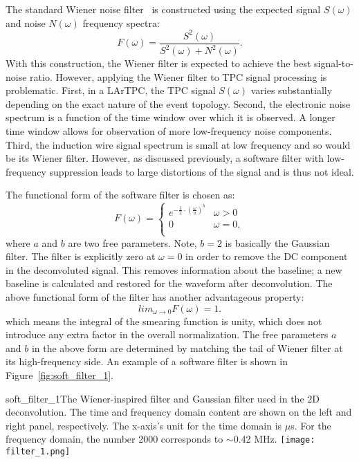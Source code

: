 The standard Wiener noise filter~\cite{wiener} is constructed using the expected 
signal $S(\omega)$ and noise $N(\omega)$ frequency spectra:
\begin{equation}
F(\omega) = \frac{S^2(\omega)}{S^2(\omega) + N^2(\omega)}.
\end{equation}
With this construction, the Wiener filter is expected to achieve the best signal-to-noise ratio. 
However, applying the Wiener filter to TPC signal processing is problematic. 
First, in a LArTPC, the TPC signal $S(\omega)$ varies substantially
depending on the exact nature of the event topology.
Second, the electronic noise spectrum is a function of the time window
over which it is observed. A longer time window allows for observation
of more low-frequency noise components.
Third, the induction wire signal spectrum is small at low frequency
and so would be its  Wiener filter.  However, as discussed previously, 
a software filter with low-frequency suppression leads to large distortions 
of the signal and is thus not ideal.  

The functional form of the software filter is chosen as:
\begin{equation}
F(\omega) = 
\begin{cases}
e^{- \frac{1}{2} \cdot \left( \frac{\omega}{a} \right)^b} &  \omega >0 \\
0 &  \omega = 0, \\
\end{cases}
\end{equation}
where $a$ and $b$ are two free parameters.  Note, $b=2$ is basically the Gaussian filter. 
The filter is explicitly zero at $\omega = 0$ in order to remove the DC component in the 
deconvoluted signal. This removes information about the baseline;  a new baseline is 
calculated and restored for the waveform after deconvolution. The above functional form 
of the filter has another advantageous property:
\begin{equation}
lim_{\omega \rightarrow 0} F(\omega) = 1.
\end{equation}
which means the integral of the smearing function is unity, which does not introduce any
extra factor in the overall normalization. The free parameters $a$ and $b$ in the above 
form are determined by matching the tail of Wiener filter at its high-frequency side. 
An example of a software filter is shown in Figure~\ref{fig:soft_filter_1}. 

\begin{cdrfigure}{soft_filter_1}{The Wiener-inspired filter and Gaussian filter used in the 2D deconvolution. 
The time and frequency domain content are shown on the left and right panel, respectively.
The x-axis's unit for the time domain is $\mu$s. For the frequency domain, the number 2000
corresponds to $\sim$0.42 MHz.}
\texttt{[image: filter\_1.png]}
\end{cdrfigure}

